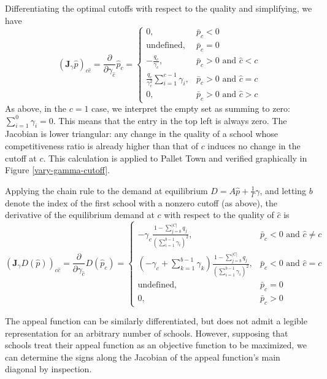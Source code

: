 \documentclass[12pt]{article}
\theoremstyle{definition}
\begin{document}
Differentiating the optimal cutoffs with respect to the quality and simplifying, we have
\begin{equation}\label{jac-gamma-p}
\left(\mathbf{J}_\gamma \hat p\right)_{c\hat c} =
\frac{\partial}{\partial\gamma_{\hat c}} \hat p_c = \begin{cases}
0, & \bar p_c < 0 \\
\text{undefined}, & \bar p_c = 0 \\
 - \frac{q_c}{\gamma_c}, & \bar p_c > 0 \text{ and }\hat c < c \\
\frac{q_c}{\gamma_c^2} \sum_{i=1}^{c-1} \gamma_i, & \bar p_c > 0 \text{ and }\hat c = c\\
0, & \bar p_c > 0 \text{ and }\hat c > c
\end{cases}
\end{equation}
As above, in the $c=1$ case, we interpret the empty set as summing to zero: $\sum_{i=1}^{0} \gamma_i = 0$. This means that the entry in the top left is always zero. The Jacobian is lower triangular: any change in the quality of a school whose competitiveness ratio is already higher than that of $c$ induces no change in the cutoff at $c$. This calculation is applied to Pallet Town and verified graphically in Figure \ref{vary-gamma-cutoff}.

Applying the chain rule to the demand at equilibrium $D = A \hat p + \frac{1}{\Gamma} \gamma$, and letting $b$ denote the index of the first school with a nonzero cutoff (as above), the derivative of the equilibrium demand at $c$ with respect to the quality of $\hat c$ is
\begin{equation} \label{jac-gamma-demand}
\left(\mathbf{J}_\gamma D\left(\hat p\right)\right)_{c\hat c} =
\frac{\partial}{\partial\gamma_{\hat c}} D(\hat p_c) = \begin{cases}
-\gamma_c \frac{1 - \sum_{j=b}^{|C|} q_j}{\left(\sum_{i=1}^{b-1} \gamma_i\right)^2}, & \bar p_c < 0 \text{ and }\hat c \neq c \\
\left(- \gamma_c + \sum_{k=1}^{b-1} \gamma_k\right)\frac{1 - \sum_{j=b}^{|C|} q_j}{\left(\sum_{i=1}^{b-1} \gamma_i\right)^2}, & \bar p_c < 0 \text{ and }\hat c = c\\
\text{undefined}, & \bar p_c = 0 \\
0, & \bar p_c > 0
\end{cases}
\end{equation}

The appeal function can be similarly differentiated, but does not admit a legible representation for an arbitrary number of schools. However, supposing that schools treat their appeal function as an objective function to be maximized, we can determine the signs along the Jacobian of the appeal function's main diagonal by inspection.
\end{document}
